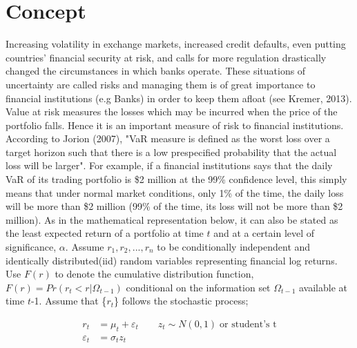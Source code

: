\documentclass[a4paper,11pt,oneside]{book}
\begin{document}

\section{Concept}
Increasing volatility in exchange markets, increased credit defaults, even putting countries' financial security at risk, and calls for more regulation drastically changed the circumstances in which banks operate. These situations of uncertainty are called risks and managing them is of great importance to financial institutions (e.g Banks) in order to keep them afloat (see Kremer, 2013). Value at risk measures the losses which may be incurred when the price of the portfolio falls. Hence it is an important measure of risk to financial institutions.
\newline\newline
According to Jorion (2007), "VaR measure is defined as the worst loss over a target horizon such that there is a low prespecified probability that the actual loss will be larger". For example, if a financial institutions says that
the daily VaR of its trading portfolio is \$2 million at the 99\%
confidence level, this simply means that under normal market conditions,
only 1\% of the time, the daily loss will be more than \$2 million (99\% of the time, its loss will not be more than \$2 million). As in the mathematical representation below, it can also be stated as the least expected return of a portfolio at time $t$ and at a certain level of significance, $\alpha$.
\newline\newline
Assume $r_1, r_2, ..., r_n$ to be conditionally independent and identically distributed(iid) random variables representing financial log returns. Use $F(r)$ to denote the cumulative distribution function,
$F(r) = Pr(r_{t} < r|\Omega_{t-1})$ conditional on the information set $\Omega_{t-1}$ available at time $t$-1. Assume that \{$r_t$\} follows the stochastic process; 

\begin{equation}
\begin{aligned}
r_t &= \mu_t + \varepsilon_t   \quad \quad z_t \sim N(0,1) \; \text{or student's t}
\\ 
\varepsilon_t &= \sigma_t  z_t
\label{1}
\end{aligned}
\end{equation}
\end{document}
